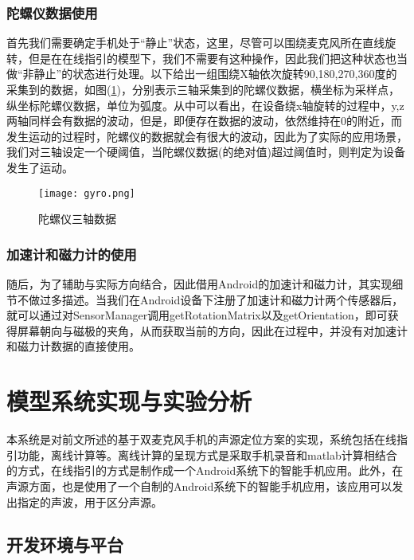 \documentclass[winfonts]{njuthesis}
\begin{document}
		\subsection{陀螺仪数据使用}	
		
			首先我们需要确定手机处于“静止”状态，这里，尽管可以围绕麦克风所在直线旋转，但是在在线指引的模型下，我们不需要有这种操作，因此我们把这种状态也当做“非静止”的状态进行处理。以下给出一组围绕X轴依次旋转90,180,270,360度的采集到的数据，如图(\ref{fig: gyro})，分别表示三轴采集到的陀螺仪数据，横坐标为采样点，纵坐标陀螺仪数据，单位为弧度。从中可以看出，在设备绕x轴旋转的过程中，y,z两轴同样会有数据的波动，但是，即便存在数据的波动，依然维持在0的附近，而发生运动的过程时，陀螺仪的数据就会有很大的波动，因此为了实际的应用场景，我们对三轴设定一个硬阈值，当陀螺仪数据(的绝对值)超过阈值时，则判定为设备发生了运动。
		
			\begin{figure}[H]
				\centering
				\texttt{[image: gyro.png]} 
				\caption{{陀螺仪三轴数据}}
				\label{fig: gyro}
			\end{figure}
		
		\subsection{加速计和磁力计的使用}	
			
			随后，为了辅助与实际方向结合，因此借用Android的加速计和磁力计，其实现细节不做过多描述。当我们在Android设备下注册了加速计和磁力计两个传感器后，就可以通过对SensorManager调用getRotationMatrix以及getOrientation，即可获得屏幕朝向与磁极的夹角，从而获取当前的方向，因此在过程中，并没有对加速计和磁力计数据的直接使用。
			
	
\chapter{模型系统实现与实验分析}
	
	本系统是对前文所述的基于双麦克风手机的声源定位方案的实现，系统包括在线指引功能，离线计算等。离线计算的呈现方式是采取手机录音和matlab计算相结合的方式，在线指引的方式是制作成一个Android系统下的智能手机应用。此外，在声源方面，也是使用了一个自制的Android系统下的智能手机应用，该应用可以发出指定的声波，用于区分声源。
	
	
	\section{开发环境与平台}
		
\end{document}
